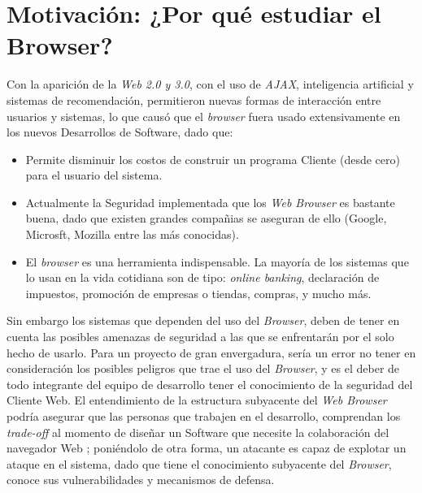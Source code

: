 \section{Motivación: ¿Por qué estudiar el Browser?}
\label{chap1:motiv}

Con la aparición de la \textit{Web 2.0 y 3.0}, con el uso de \textit{AJAX}, inteligencia artificial y sistemas de recomendación, permitieron nuevas formas de interacción entre usuarios y sistemas, lo que causó que el \textit{browser} fuera usado extensivamente en los nuevos Desarrollos de Software, dado que:
\begin{itemize}
	\item Permite disminuir los costos de construir un programa Cliente (desde cero) para el usuario del sistema.
	\item Actualmente la Seguridad implementada que los \textit{Web Browser} es bastante buena, dado que existen grandes compañias se aseguran de ello (Google, Microsft, Mozilla entre las más conocidas). 
	\item El \textit{browser} es una herramienta indispensable. La mayoría de los sistemas que lo usan en la vida cotidiana son de tipo: \textit{online banking}, declaración de impuestos, promoción de empresas o tiendas, compras, y mucho más.
\end{itemize}

Sin embargo los sistemas que dependen del uso del \textit{Browser}, deben de tener en cuenta las posibles amenazas de seguridad a las que se enfrentarán por el solo hecho de usarlo. Para un proyecto de gran envergadura, sería un error no tener en consideración los posibles peligros que trae el uso del \textit{Browser}, y es el deber de todo integrante del equipo de desarrollo tener el conocimiento de la seguridad del Cliente Web. El entendimiento de la estructura subyacente del \textit{Web Browser} podría asegurar que las personas que trabajen en el desarrollo, comprendan los \textit{trade-off} al momento de diseñar un Software que necesite la colaboración del navegador Web \cite{535061, 2005-grosskurth-browser-refarch,preprint-grosskurth-browser-archevol}; poniéndolo de otra forma, un atacante es capaz de explotar un ataque en el sistema, dado que tiene el conocimiento subyacente del \textit{Browser}, conoce sus vulnerabilidades y mecanismos de defensa.

